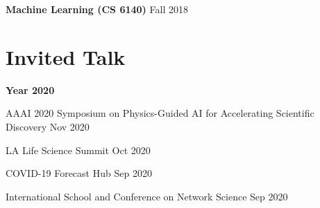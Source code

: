 \documentclass[margin,line]{res}
\begin{document}
\begin{resume}
 {\bf Machine Learning (CS 6140)}   \hfill  { Fall 2018 } 


% 
 
% 
% 








\section{\sc Invited Talk}

 {\bf Year  2020}


AAAI 2020 Symposium on Physics-Guided AI for Accelerating Scientific Discovery \hfill{Nov 2020}

LA Life Science Summit \hfill{Oct 2020}

COVID-19 Forecast Hub  \hfill{Sep 2020}
 
International School and Conference on Network Science  \hfill{Sep 2020}
 

\end{resume}
\end{document}
